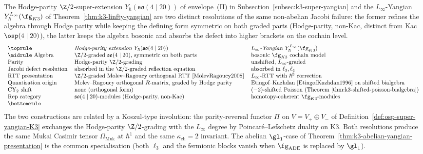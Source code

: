 \begin{remark}
\label{rem:k3-linfty-vs-osp}
The Hodge-parity $\Z/2$-super-extension
$Y_\hbar(\mathfrak{so}(4 \mid 20))$ of envelope~(II) in
Subsection~\ref{subsec:k3-super-yangian} and the $L_\infty$-Yangian
$Y_\hbar^{L_\infty}(\fg_{K3})$ of
Theorem~\ref{thm:k3-linfty-yangian} are two distinct resolutions of
the same non-abelian Jacobi failure: the former refines the algebra
through Hodge parity while keeping the defining form symmetric on
both graded parts (Hodge-parity, non-Kac, distinct from Kac
$\osp(4 \mid 20)$), the latter keeps the algebra bosonic and absorbs
the defect into higher brackets on the cochain level.
\[
 \begin{tabular}{lll}
 \toprule
 & \emph{Hodge-parity extension} $Y_\hbar(\mathfrak{so}(4 \mid 20))$ & \emph{$L_\infty$-Yangian}
 $Y_\hbar^{L_\infty}(\fg_{K3})$ \\
 \midrule
 Algebra & $\Z/2$-graded $\mathfrak{so}(4 \mid 20)$, symmetric on both parts & bosonic $\fg_{K3}$ cochain model \\
 Parity & Hodge-parity $\Z/2$-grading & unshifted, $L_\infty$-graded \\
 Jacobi defect resolution & absorbed in the $\Z/2$-graded reflection equation &
 absorbed in $\ell_3, \ell_4$ \\
 RTT presentation & $\Z/2$-graded Molev--Ragoucy orthogonal RTT
 \cite{MolevRagoucy2008} & $L_\infty$-RTT with
 $\hbar^3$ correction \\
 Quantisation origin & Molev--Ragoucy orthogonal $R$-matrix, graded by Hodge parity &
 Etingof--Kazhdan~\cite{EtingofKazhdan1996} on shifted bialgebra \\
 CY$_2$ shift & none (orthogonal form) & $(-2)$-shifted Poisson
 (Theorem~\ref{thm:k3-shifted-poisson-bialgebra}) \\
 Rep category & $\mathfrak{so}(4 \mid 20)$-modules (Hodge-parity, non-Kac) &
 homotopy-coherent $\fg_{K3}$-modules \\
 \bottomrule
 \end{tabular}
\]
The two constructions are related by a Koszul-type involution: the
parity-reversal functor $\Pi$ on $V = V_+ \oplus V_-$ of
Definition~\ref{def:osp-super-yangian-K3} exchanges the Hodge-parity
$\Z/2$-grading with the $L_\infty$ degree by Poincar\'e--Lefschetz
duality on K$3$. Both resolutions produce the same Mukai Casimir tensor
$\Omega_{\mathrm{Muk}}$ at $\hbar^1$ and the same $\kappa_{\mathrm{ch}} =
2$ invariant. The abelian $\gl_1$-case of
Theorem~\ref{thm:k3-abelian-yangian-presentation} is the common
specialisation (both $\ell_3$ and the fermionic blocks vanish when
$\fg_{\mathrm{ADE}}$ is replaced by $\gl_1$).
\end{remark}


